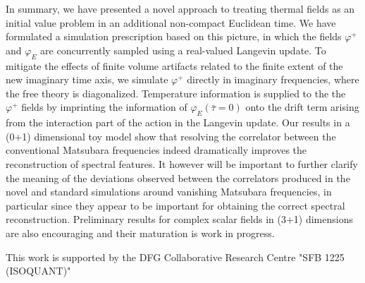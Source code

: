 \documentclass[epj]{webofc}
\begin{document}
In summary, we have presented a novel approach to treating thermal fields as an initial value problem in an additional non-compact Euclidean time. We have formulated a simulation prescription based on this picture, in which the fields $\varphi^+$ and $\varphi_E$ are concurrently sampled using a real-valued Langevin update. To mitigate the effects of finite volume artifacts related to the finite extent of the new imaginary time axis, we simulate $\varphi^+$ directly in imaginary frequencies, where the free theory is diagonalized. Temperature information is supplied to the the $\varphi^+$ fields by imprinting the information of $\varphi_E(\bar\tau=0)$ onto the drift term arising from the interaction part of the action in the Langevin update. Our results in a (0+1) dimensional toy model show that resolving the correlator between the conventional Matsubara frequencies indeed dramatically improves the reconstruction of spectral features. It however will be important to further clarify the meaning of the deviations observed between the correlators produced in the novel and standard simulations around vanishing Matsubara frequencies, in particular since they appear to be important for obtaining the correct spectral reconstruction. Preliminary results for complex scalar fields in (3+1) dimensions are also encouraging and their maturation is work in progress. 

This work is supported by the DFG Collaborative Research Centre "SFB 1225 (ISOQUANT)"

\vspace{-0.2cm}


\end{document}
